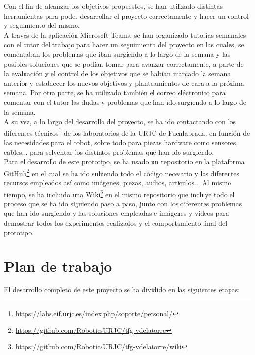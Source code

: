 Con el fin de alcanzar los objetivos propuestos, se han utilizado distintas herramientas para poder desarrollar el proyecto correctamente y
hacer un control y seguimiento del mismo.\\

A través de la aplicación Microsoft Teams, se han organizado tutorías semanales con el tutor del trabajo para hacer un seguimiento del proyecto en las cuales, se comentaban los problemas que iban surgiendo a lo largo de la semana y las posibles soluciones que se podían tomar para avanzar correctamente, a parte de la evaluación y el control de los objetivos que se habían marcado la semana anterior y establecer los nuevos objetivos y planteamientos de cara a la próxima semana. Por otra parte, se ha utilizado también el correo eléctronico para comentar con el tutor las dudas y problemas que han ido surgiendo a lo largo de la semana.\\ 


A su vez, a lo largo del desarrollo del proyecto, se ha ido contactando con los diferentes técnicos\footnote{\url{https://labs.eif.urjc.es/index.php/soporte/personal/}} de los laboratorios de la \hyperlink{URJC}{URJC} de Fuenlabrada, en función de las necesidades para el robot, sobre todo para piezas hardware como sensores, cables... para solventar los distintos problemas que han ido surgiendo.\\ 

Para el desarrollo de este prototipo, se ha usado un repositorio en la plataforma GitHub\footnote{\url{https://github.com/RoboticsURJC/tfg-vdelatorre}} en el cual se ha ido subiendo todo el código necesario y los diferentes recursos empleados así como imágenes, piezas, audios, artículos... Al mismo tiempo, se ha incluido una Wiki\footnote{\url{https://github.com/RoboticsURJC/tfg-vdelatorre/wiki}} en el mismo repositorio que incluye todo el proceso que se ha ido siguiendo paso a paso, junto con los diferentes problemas que han ido surgiendo y las soluciones empleadas e imágenes y vídeos para demostrar todos los experimentos realizados y el comportamiento final del prototipo.




\section{Plan de trabajo}
\label{sec:plantrabajo}

El desarrollo completo de este proyecto se ha dividido en las siguientes etapas:


